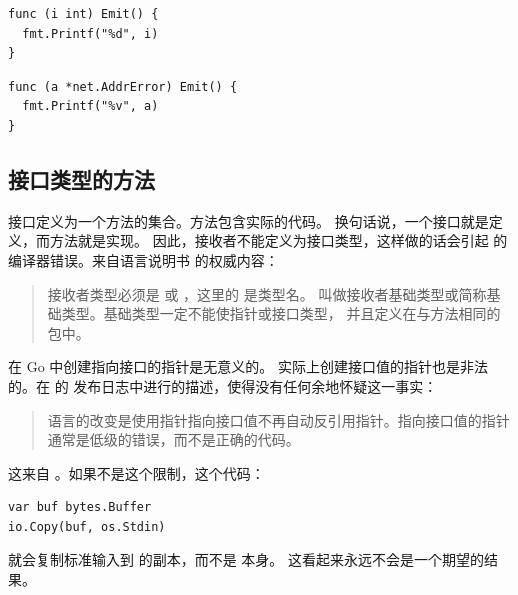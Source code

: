 \begin{minipage}{.5\textwidth}
\begin{lstlisting}[linewidth=.7\textwidth,caption=扩展内建类型错误]
func (i int) Emit() {
  fmt.Printf("%d", i)
}
\end{lstlisting}
\noindent{}
\end{minipage}
\begin{minipage}{.5\textwidth}
\begin{lstlisting}[caption=扩展非本地类型错误]
func (a *net.AddrError) Emit() {
  fmt.Printf("%v", a)
}
\end{lstlisting}
\noindent{}
\end{minipage}

\paragraph{}  %

\subsection{接口类型的方法}
接口定义为一个方法的集合。方法包含实际的代码。
换句话说，一个接口就是定义，而方法就是实现。
因此，接收者不能定义为接口类型，这样做的话会引起
 的编译器错误。来自语言说明书 \cite{go_spec} 的权威内容：
\begin{quote}
接收者类型必须是  或 ，这里的  是类型名。
 叫做接收者基础类型或简称基础类型。基础类型一定不能使指针或接口类型，
并且定义在与方法相同的包中。
\end{quote}

\begin{lbar}
在 Go 中创建指向接口的指针是无意义的。
实际上创建接口值的指针也是非法的。在  的
发布日志中进行的描述，使得没有任何余地怀疑这一事实：
\begin{quote}
语言的改变是使用指针指向接口值不再自动反引用指针。指向接口值的指针通常是低级的错误，而不是正确的代码。
\end{quote}
这来自 \cite{go_faq}。如果不是这个限制，这个代码：
\begin{lstlisting}
var buf bytes.Buffer
io.Copy(buf, os.Stdin)
\end{lstlisting}
就会复制标准输入到  的副本，而不是  本身。
这看起来永远不会是一个期望的结果。
\end{lbar}

